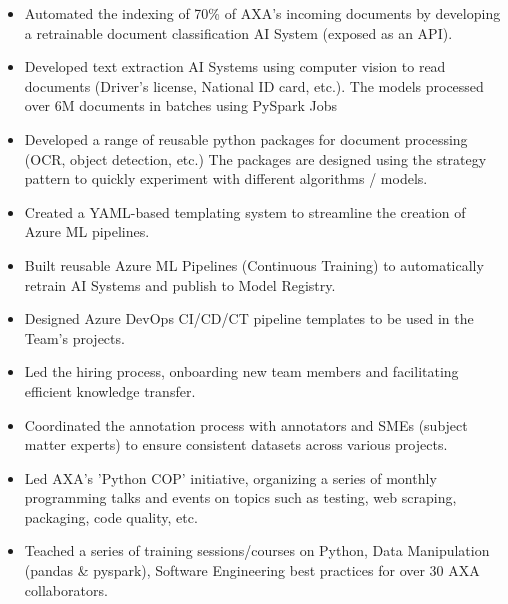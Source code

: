 \documentclass[10pt,letter,ragged2e,withhyper]{altacv}
\renewcommand{\divider}{\textcolor{body!30}{\hdashrule{\linewidth}{0.6pt}{0.5ex}}\medskip}
\begin{document}
\begin{paracol}{2}



\begin{itemize}
  \item Automated the indexing of 70\% of AXA's incoming documents by developing a retrainable document classification AI System (exposed as an API).
  \item Developed text extraction AI Systems using computer vision to read documents (Driver's license, National ID card, etc.). The models processed over 6M documents in batches using PySpark Jobs
  \item Developed a range of reusable python packages for document processing (OCR, object detection, etc.) The packages are designed using the strategy pattern to quickly experiment with different algorithms / models.
  \item Created a YAML-based templating system to streamline the creation of Azure ML pipelines.
  \item Built reusable Azure ML Pipelines (Continuous Training) to automatically retrain AI Systems and publish to Model Registry.
  \item Designed Azure DevOps CI/CD/CT pipeline templates to be used in the Team's projects.
  \item Led the hiring process, onboarding new team members and facilitating efficient knowledge transfer.
  \item Coordinated the annotation process with annotators and SMEs (subject matter experts) to ensure consistent datasets across various projects.
  \item Led AXA's 'Python COP' initiative, organizing a series of monthly programming talks and events on topics such as testing, web scraping, packaging, code quality, etc.
  \item Teached a series of training sessions/courses on Python, Data Manipulation (pandas \& pyspark), Software Engineering best practices for over 30 AXA collaborators.
\end{itemize}

\divider
{}


\end{paracol}
\end{document}
